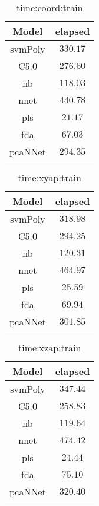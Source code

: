 \begin{table}[!ht]
	\centering
	\begin{tabular}{|c|c|}
		\hline
		Model & elapsed \\ \hline
		svmPoly & $330.17$ \\ \hline
		C5.0 & $276.60$ \\ \hline
		nb & $118.03$ \\ \hline
		nnet & $440.78$ \\ \hline
		pls & $21.17$ \\ \hline
		fda & $67.03$ \\ \hline
		pcaNNet & $294.35$ \\ \hline
	\end{tabular}
	\caption{time:coord:train}
	\label{tab:time:coord:train}
\end{table}

\begin{table}[!ht]
	\centering
	\begin{tabular}{|c|c|}
		\hline
		Model & elapsed \\ \hline
		svmPoly & $318.98$ \\ \hline
		C5.0 & $294.25$ \\ \hline
		nb & $120.31$ \\ \hline
		nnet & $464.97$ \\ \hline
		pls & $25.59$ \\ \hline
		fda & $69.94$ \\ \hline
		pcaNNet & $301.85$ \\ \hline
	\end{tabular}
	\caption{time:xyap:train}
	\label{tab:time:xyap:train}
\end{table}

\begin{table}[!ht]
	\centering
	\begin{tabular}{|c|c|}
		\hline
		Model & elapsed \\ \hline
		svmPoly & $347.44$ \\ \hline
		C5.0 & $258.83$ \\ \hline
		nb & $119.64$ \\ \hline
		nnet & $474.42$ \\ \hline
		pls & $24.44$ \\ \hline
		fda & $75.10$ \\ \hline
		pcaNNet & $320.40$ \\ \hline
	\end{tabular}
	\caption{time:xzap:train}
	\label{tab:time:xzap:train}
\end{table}

